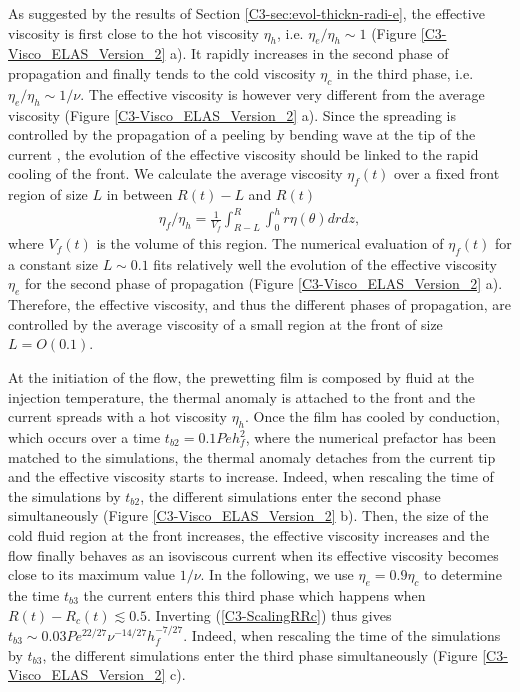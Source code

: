 As      suggested       by      the      results       of      Section
\ref{C3-sec:evol-thickn-radi-e},  the  effective  viscosity  is  first
close  to the  hot viscosity  $\eta_h$, i.e.   $\eta_e/\eta_h \sim  1$
(Figure \ref{C3-Visco_ELAS_Version_2} a).  It rapidly increases in the
second phase  of propagation and  finally tends to the  cold viscosity
$\eta_c$ in  the third  phase, i.e.   $\eta_e/\eta_h \sim  1/\nu$. The
effective  viscosity  is  however  very  different  from  the  average
viscosity   (Figure  \ref{C3-Visco_ELAS_Version_2}   a).   Since   the
spreading is  controlled by  the propagation of  a peeling  by bending
wave at the tip of the current \citep{Lister:2013ia}, the evolution of
the effective viscosity  should be linked to the rapid  cooling of the
front. We  calculate the  average viscosity  $\eta_f(t)$ over  a fixed
front region of size $L$ in between $R(t)-L$ and $R(t)$
\begin{eqnarray}
  \eta_f/\eta_h =
  \frac{1}{V_f}\int_{R-L}^{R}\int_0^{h}  r  \eta(\theta)
  dr dz, \label{C3-front-visco}
\end{eqnarray}
where $V_f(t)$ is the volume of this region.  The numerical evaluation
of $\eta_f(t)$ for  a constant size $L \sim 0.1$  fits relatively well
the evolution of the effective viscosity $\eta_e$ for the second phase
of propagation  (Figure \ref{C3-Visco_ELAS_Version_2}  a).  Therefore,
the effective viscosity, and thus the different phases of propagation,
are controlled by the average viscosity of a small region at the front
of size $L=O(0.1)$.

At the  initiation of  the flow,  the prewetting  film is  composed by
fluid at the injection temperature, the thermal anomaly is attached to
the front and the current spreads  with a hot viscosity $\eta_h$. Once
the  film  has  cooled  by   conduction,  which  occurs  over  a  time
$t_{b2}=0.1Peh_f^2$, where the numerical prefactor has been matched to
the simulations, the thermal anomaly detaches from the current tip and
the effective  viscosity starts  to increase.  Indeed,  when rescaling
the time  of the  simulations by  $t_{b2}$, the  different simulations
enter      the      second      phase      simultaneously      (Figure
\ref{C3-Visco_ELAS_Version_2} b).   Then, the  size of the  cold fluid
region at the  front increases, the effective  viscosity increases and
the flow finally  behaves as an isoviscous current  when its effective
viscosity  becomes  close  to  its  maximum  value  $1/\nu$.   In  the
following, we use $\eta_e =  0.9\eta_c$ to determine the time $t_{b3}$
the   current   enters   this   third   phase   which   happens   when
$R(t)-R_c(t)  \lesssim  0.5$.   Inverting  (\ref{C3-ScalingRRc})  thus
gives  $t_{b3}\sim  0.03 Pe^{22/27}\nu^{-14/27}h_f^{-7/27}$.   Indeed,
when rescaling the time of  the simulations by $t_{b3}$, the different
simulations   enter    the   third   phase    simultaneously   (Figure
\ref{C3-Visco_ELAS_Version_2} c).

